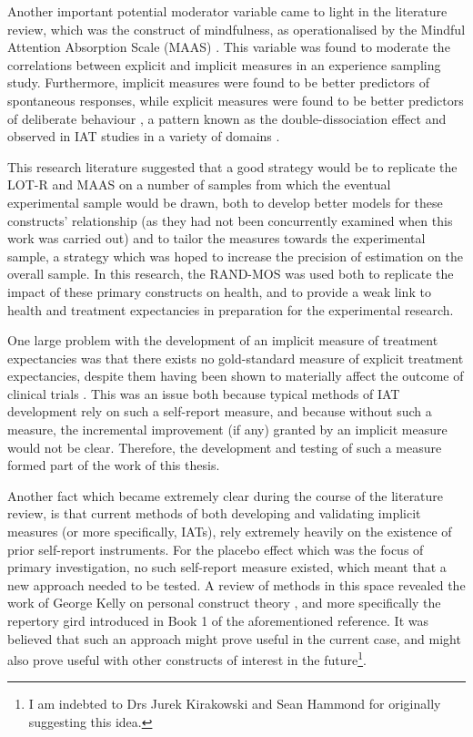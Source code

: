 Another important potential moderator variable came to light in the
literature review, which was the construct of mindfulness, as
operationalised by the Mindful Attention Absorption Scale (MAAS)
\cite{brown2003benefits}. This variable was found to moderate the
correlations between explicit and implicit measures in an experience
sampling study. Furthermore, implicit measures were found to be better
predictors of spontaneous responses, while explicit measures were
found to be better predictors of deliberate behaviour
\cite{Levesque2007}, a pattern known as the double-dissociation effect
and observed in IAT studies in a variety of domains
\cite{Asendorpf2002,Perugini2005,Grumm2007,Steffens2006}.

This research literature suggested that a good strategy would be to
replicate the LOT-R and MAAS on a number of samples from which the
eventual experimental sample would be drawn, both to develop better
models for these constructs' relationship (as they had not been
concurrently examined when this work was carried out) and to tailor
the measures towards the experimental sample, a strategy which was
hoped to increase the precision of estimation on the overall sample.
In this research, the RAND-MOS was used both to replicate the impact
of these primary constructs on health, and to provide a weak link to
health and treatment expectancies in preparation for the experimental
research.

One large problem with the development of an implicit measure of
treatment expectancies was that there exists no gold-standard measure
of explicit treatment expectancies, despite them having been shown to
materially affect the outcome of clinical trials
\cite{Linde2007,Bausell2005,Benedetti2005}. This was an issue both
because typical methods of IAT development rely on such a self-report
measure, and because without such a measure, the incremental
improvement (if any) granted by an implicit measure would not be
clear. Therefore, the development and testing of such a measure formed
part of the work of this thesis.

Another fact which became extremely clear during the course of the
literature review, is that current methods of both developing and
validating implicit measures (or more specifically, IATs), rely
extremely heavily on the existence of prior self-report instruments.
For the placebo effect which was the focus of primary investigation,
no such self-report measure existed, which meant that a new approach
needed to be tested. A review of methods in this space revealed the
work of George Kelly on personal construct theory \cite{Kelly1991},
and more specifically the repertory gird introduced in Book 1 of the
aforementioned reference. It was believed that such an approach might
prove useful in the current case, and might also prove useful with
other constructs of interest in the future\footnote{I am indebted to
Drs Jurek Kirakowski and Sean Hammond for originally suggesting this
idea.}.

